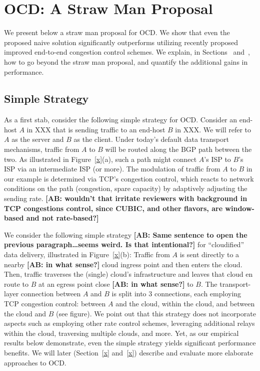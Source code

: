 \documentclass[10pt,sigconf]{acmart}
\newcommand{\mycomm}[3]{{\color{#2} \textbf{[#1: #3]}}}
\newcommand{\mycomm}[3]{}
\newcommand{\AB}[1]{\mycomm{AB}{orange}{#1}}
\begin{document}
\section{OCD: A Straw Man Proposal}\label{sec:straw_man}

We present below a straw man proposal for OCD. We show that even the proposed naive solution significantly outperforms utilizing recently proposed improved end-to-end congestion control schemes. We explain, in Sections~\cite{x} and~\cite{x}, how to go beyond the straw man proposal, and quantify the additional gains in performance.

\subsection{Simple Strategy}

As a first stab, consider the following simple strategy for OCD. Consider an
end-host $A$ in XXX that is sending traffic to an end-host $B$ in XXX. We will
refer to $A$ as the server and $B$ as the client. Under today's default data
transport mechanisms, traffic from $A$ to $B$ will be routed along the BGP path
between the two. As illustrated in Figure~\ref{x}(a), such a path might connect
$A$'s ISP to $B$'s ISP via an intermediate ISP (or more). The modulation of
traffic from $A$ to $B$ in our example is determined via TCP's congestion
control, which reacts to network conditions on the path (congestion, spare
capacity) by adaptively adjusting the sending rate.\AB{wouldn't that irritate
reviewers with background in TCP congestions control, since CUBIC, and other
flavors, are window-based and not rate-based?}

We consider the following simple strategy\AB{Same sentence to open the previous
paragraph\ldots seems weird. Is that intentional?} for ``cloudified'' data
delivery, illustrated in Figure~\ref{x}(b):
Traffic from $A$ is sent directly to a nearby\AB{in what sense?} cloud ingress
point and then enters the cloud. Then, traffic traverses the (single) cloud's
infrastructure and leaves that cloud en route to $B$ at an egress point
close\AB{in what sense?} to $B$. The transport-layer connection between $A$ and
$B$ is split into $3$ connections, each employing TCP congestion control: between $A$ and the cloud, within the cloud, and between the cloud and $B$ (see figure). We point out that this strategy does not incorporate aspects such as employing other rate control schemes, leveraging additional relays within the cloud, traversing multiple clouds, and more. Yet, as our empirical results below demonstrate, even the simple strategy yields significant performance benefits. We will later (Section~\ref{x} and~\ref{x}) describe and evaluate more elaborate approaches to OCD.
\end{document}
